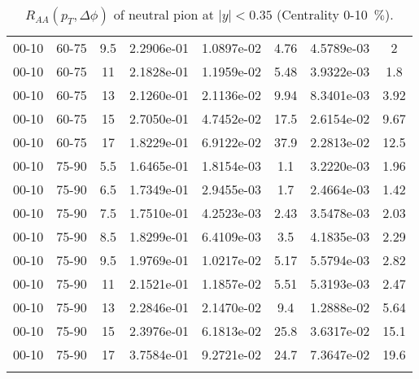 \begin{longtable}{|cccccccc|}
00-10 & 60-75 & 9.5 & 2.2906e-01 & 1.0897e-02 & 4.76 & 4.5789e-03 & 2 \\ 
00-10 & 60-75 & 11 & 2.1828e-01 & 1.1959e-02 & 5.48 & 3.9322e-03 & 1.8 \\ 
00-10 & 60-75 & 13 & 2.1260e-01 & 2.1136e-02 & 9.94 & 8.3401e-03 & 3.92 \\ 
00-10 & 60-75 & 15 & 2.7050e-01 & 4.7452e-02 & 17.5 & 2.6154e-02 & 9.67 \\ 
00-10 & 60-75 & 17 & 1.8229e-01 & 6.9122e-02 & 37.9 & 2.2813e-02 & 12.5 \\ 
\hline
00-10 & 75-90 & 5.5 & 1.6465e-01 & 1.8154e-03 & 1.1 & 3.2220e-03 & 1.96 \\ 
00-10 & 75-90 & 6.5 & 1.7349e-01 & 2.9455e-03 & 1.7 & 2.4664e-03 & 1.42 \\ 
00-10 & 75-90 & 7.5 & 1.7510e-01 & 4.2523e-03 & 2.43 & 3.5478e-03 & 2.03 \\ 
00-10 & 75-90 & 8.5 & 1.8299e-01 & 6.4109e-03 & 3.5 & 4.1835e-03 & 2.29 \\ 
00-10 & 75-90 & 9.5 & 1.9769e-01 & 1.0217e-02 & 5.17 & 5.5794e-03 & 2.82 \\ 
00-10 & 75-90 & 11 & 2.1521e-01 & 1.1857e-02 & 5.51 & 5.3193e-03 & 2.47 \\ 
00-10 & 75-90 & 13 & 2.2846e-01 & 2.1470e-02 & 9.4 & 1.2888e-02 & 5.64 \\ 
00-10 & 75-90 & 15 & 2.3976e-01 & 6.1813e-02 & 25.8 & 3.6317e-02 & 15.1 \\ 
00-10 & 75-90 & 17 & 3.7584e-01 & 9.2721e-02 & 24.7 & 7.3647e-02 & 19.6 \\ 
\hline
\caption{$R_{AA}(p_{T},\Delta\phi)$ of neutral pion at $|y|<0.35$ (Centrality 0-10~$\%$).}
\end{longtable}
            
